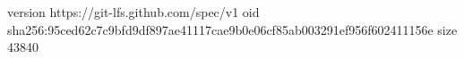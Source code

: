 version https://git-lfs.github.com/spec/v1
oid sha256:95ced62c7c9bfd9df897ae41117cae9b0e06cf85ab003291ef956f602411156e
size 43840
